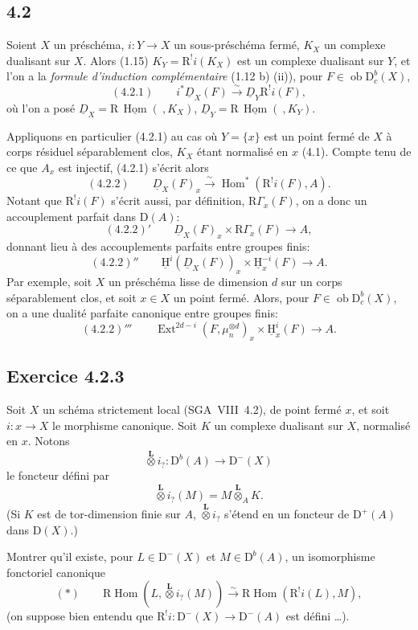 \documentclass[11pt]{article}
\providecommand{\uH}{\underline{\mathrm H}}
\DeclareMathOperator{\Hom}{Hom}
\DeclareMathOperator{\Ext}{Ext}
\newcommand{\R}{\mathrm{R}}
\newcommand{\D}{\mathrm{D}}
\newcommand{\ob}{\operatorname{ob}}
\providecommand{\Hom}{\operatorname{Hom}}
\providecommand{\ob}{\operatorname{ob}}
\providecommand{\R}{\mathrm R}
\providecommand{\Hom}{\operatorname{Hom}}
\begin{document}
\subsection*{4.2}
Soient $X$ un préschéma, $i:Y\to X$ un sous-préschéma fermé, $K_X$ un complexe dualisant sur $X$. Alors (1.15) $K_Y=\R^{!}i(K_X)$ est un complexe dualisant sur $Y$, et l'on a la \emph{formule d'induction complémentaire} (1.12 b) (ii)), pour $F\in \ob\D_c^b(X)$,
\[
(4.2.1)\qquad i^*\underline{D}_X(F)\xrightarrow{\sim}\underline{D}_Y\R^{!}i(F),
\]
où l'on a posé $\underline{D}_X=\R\,\underline{\Hom}(\ ,K_X)$, $\underline{D}_Y=\R\,\underline{\Hom}(\ ,K_Y)$.

Appliquons en particulier (4.2.1) au cas où $Y=\{x\}$ est un point fermé de $X$ à corps résiduel séparablement clos, $K_X$ étant normalisé en $x$ (4.1). Compte tenu de ce que $A_x$ est injectif, (4.2.1) s'écrit alors
\[
(4.2.2)\qquad \underline{D}_X(F)_x\xrightarrow{\sim}\Hom^*(\R^{!}i(F),A).
\]
Notant que $\R^{!}i(F)$ s'écrit aussi, par définition, $\R\Gamma_x(F)$, on a donc un accouplement parfait dans $\D(A)$:
\[
(4.2.2)'\qquad \underline{D}_X(F)_x\times \R\Gamma_x(F)\longrightarrow A,
\]
donnant lieu à des accouplements parfaits entre groupes finis:
\[
(4.2.2)''\qquad \uH^i(\underline{D}_X(F))_x\times \uH_x^{-i}(F)\longrightarrow A.
\]
Par exemple, soit $X$ un préschéma lisse de dimension $d$ sur un corps séparablement clos, et soit $x\in X$ un point fermé. Alors, pour $F\in\ob\D_c^b(X)$, on a une dualité parfaite canonique entre groupes finis:
\[
(4.2.2)'''\qquad \Ext^{2d-i}(F,\mu_n^{\otimes d})_x\times \uH_x^i(F)\longrightarrow A.
\]

\subsection*{Exercice 4.2.3}
Soit $X$ un schéma strictement local (SGA~VIII~4.2), de point fermé $x$, et soit $i:x\to X$ le morphisme canonique. Soit $K$ un complexe dualisant sur $X$, normalisé en $x$. Notons
\[
\overset{\mathbf L}{\otimes} i_? : \D^b(A)\longrightarrow \D^-(X)
\]
le foncteur défini par
\[
\overset{\mathbf L}{\otimes} i_?(M)=M\overset{\mathbf L}{\otimes}_A K.
\]
(Si $K$ est de tor-dimension finie sur $A$, $\overset{\mathbf L}{\otimes} i_?$ s'étend en un foncteur de $\D^+(A)$ dans $\D(X)$.)

Montrer qu'il existe, pour $L\in\D^-(X)$ et $M\in\D^b(A)$, un isomorphisme fonctoriel canonique
\[
(*)\qquad \R\Hom(L,\overset{\mathbf L}{\otimes} i_?(M))\xrightarrow{\sim}\R\Hom(\R^{!}i(L),M),
\]
(on suppose bien entendu que $\R^{!}i:\D^-(X)\to\D^-(A)$ est défini \dots).
\end{document}
